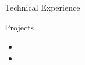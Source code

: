 \documentclass[]{structure}
\begin{document}
	\begin{cvsection}{Technical Experience}
		\begin{cvsubsection}{Projects}{}{}
			\begin{itemize}
				\item \textbf{
				\item \textbf{} (). 
				\item \textbf{
			\end{itemize}
		\end{cvsubsection}
	\end{cvsection}
	
	\begin{cvsection}{}
		\begin{cvsubsection}{}{}{}	
			\begin{itemize}
				\item \textbf} 
				\item \textbf{} 
			\end{itemize}
		\end{cvsubsection}
	\end{cvsection}
	
	\begin{cvsection}{}
		\begin{cvsubsection}{}{}{}	
			\begin{itemize}
				\item 
				\item 
			\end{itemize}
		\end{cvsubsection}
	\end{cvsection}
	
\end{document}

